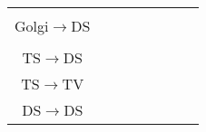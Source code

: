 \begin{longtable}{cXXXXXXX}
                                 &                                                  &                                                                                                                    &                                                           &                                           &                                                                                             &                                           & \\ 
Golgi\ensuremath{\rightarrow}DS  &                                                  &                                                                                                                    &                                                           &                                           &                                                                                             &                                           & \\\midrule
                                 &                                                  &                                                                                                                    &                                                           &                                           &                                                                                             &                                           & \\
  TS\ensuremath{\rightarrow}DS   &                                                  &                                                                                                                    &                                                           &                                           &                                                                                             &                                           & \\ 
  TS\ensuremath{\rightarrow}TV   &                                                  &                                                                                                                    &                                                           &                                           &                                                                                             &                                           & \\ 
  DS\ensuremath{\rightarrow}DS   &                                                  &                                                                                                                    &                                                           &                                           &                                                                                             & \\ 

\end{longtable}

